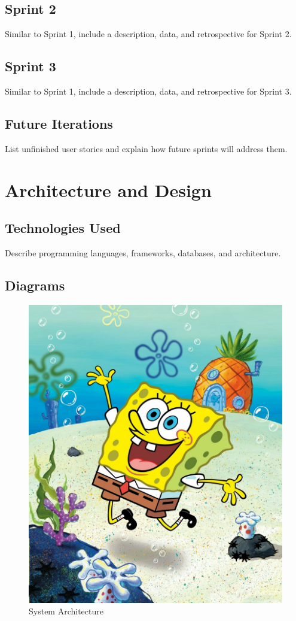 \documentclass[12pt]{article}
\begin{document}
\subsection{Sprint 2}
Similar to Sprint 1, include a description, data, and retrospective for Sprint 2.

\subsection{Sprint 3}
Similar to Sprint 1, include a description, data, and retrospective for Sprint 3.

\subsection{Future Iterations}
List unfinished user stories and explain how future sprints will address them.

\newpage
\section{Architecture and Design}
\FloatBarrier 

\subsection{Technologies Used}
Describe programming languages, frameworks, databases, and architecture.

\subsection{Diagrams}
\begin{figure}[H] 
    \centering
    \includegraphics[width=\textwidth]{architecture_diagram.png}
    \caption{System Architecture}
    \label{fig:architecture_diagram}
\end{figure}
\end{document}

